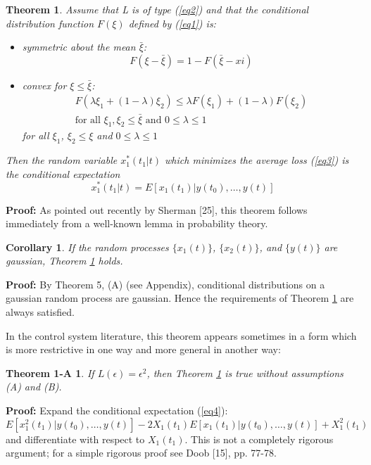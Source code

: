 \documentclass{article}
\newtheorem{theorem}{Theorem}
\newtheorem*{theorem1a}{Theorem 1-A}
\newtheorem*{corollary}{Corollary}
\begin{document}
\begin{theorem}
\label{th1}
Assume that L is of type (\ref{eq2}) and that the conditional distribution function $F(\xi)$ defined by (\ref{eq1}) is:
\begin{itemize}
\item[A] symmetric about the mean $\bar{\xi}$:
    \begin{equation*}
    F(\xi-\bar{\xi})=1-F(\bar{\xi}-xi)
    \end{equation*}
\item[B] convex for $\xi \le \bar{\xi}$:
    \begin{multline*}
    F(\lambda\xi_1+(1-\lambda)\xi_2) \le \lambda F(\xi_1)+(1-\lambda)F(\xi_2)\\
    \text{for all }\xi_1,\xi_2 \le \bar{\xi} \text{ and } 0 \le \lambda \le 1
    \end{multline*}
for all $\xi_1$, $\xi_2 \le \xi$ and $0 \le \lambda \le 1$
\end{itemize}
Then the random variable $x_1^\ast(t_1 \vert t)$ which minimizes the average loss (\ref{eq3}) is the conditional expectation
\begin{equation}
\label{eq5}
x^{\ast}_1(t_1 \vert t)=E[x_1(t_1) \vert y(t_0),\dotsc,y(t)]
\end{equation}
\end{theorem}

\textbf{Proof:} As pointed out recently by Sherman [25], this theorem follows immediately from a well-known lemma in probability theory.
\begin{corollary}
If the random processes $\{x_1(t)\}$, $\{x_2(t)\}$, and $\{y(t)\}$ are gaussian, Theorem \ref{th1} holds.
\end{corollary}
\textbf{Proof:} By Theorem 5, (A) (see Appendix), conditional distributions on a gaussian random process are gaussian. Hence the requirements of Theorem \ref{th1} are always satisfied.

In the control system literature, this theorem appears sometimes in a form which is more restrictive in one way and more general in another way:
\begin{theorem1a}
\label{th1a}
If $L(\epsilon) = \epsilon^2$, then Theorem \ref{th1} is true without assumptions (A) and (B).
\end{theorem1a}

\textbf{Proof:} Expand the conditional expectation (\ref{eq4}):
\begin{equation*}
E[x_1^2(t_1) \vert y(t_0),\dotsc,y(t)]-2X_1(t_1)E[x_1(t_1) \vert y(t_0),\dotsc,y(t)]+X_1^2(t_1)
\end{equation*}
and differentiate with respect to $X_1(t_1)$. This is not a completely rigorous argument; for a simple rigorous proof see Doob [15], pp. 77-78.
\end{document}
